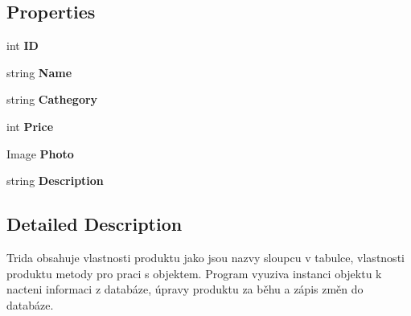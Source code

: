 \subsection*{Properties}
\begin{DoxyCompactItemize}
\item 
\mbox{\label{class_eshop_1_1_product_a7c96eeb965bd5baa8eddb5601421c2f8}} 
int {\bfseries ID}
\item 
\mbox{\label{class_eshop_1_1_product_a960f38474f0d8c9f8f49804447079074}} 
string {\bfseries Name}
\item 
\mbox{\label{class_eshop_1_1_product_aadf2d177d03b13806e1656d986e97c00}} 
string {\bfseries Cathegory}
\item 
\mbox{\label{class_eshop_1_1_product_a88ade23a5d45c3b8334341ec1c15f0f7}} 
int {\bfseries Price}
\item 
\mbox{\label{class_eshop_1_1_product_a8db3a3ade9ae207fec6efec1e1fff7e1}} 
Image {\bfseries Photo}
\item 
\mbox{\label{class_eshop_1_1_product_aa5dfddbd5511f0db72f07a9810d1507a}} 
string {\bfseries Description}
\end{DoxyCompactItemize}


\subsection{Detailed Description}
Trida obsahuje vlastnosti produktu jako jsou nazvy sloupcu v tabulce, vlastnosti produktu metody pro praci s objektem. Program vyuziva instanci objektu k nacteni informaci z databáze, úpravy produktu za běhu a zápis změn do databáze. 



